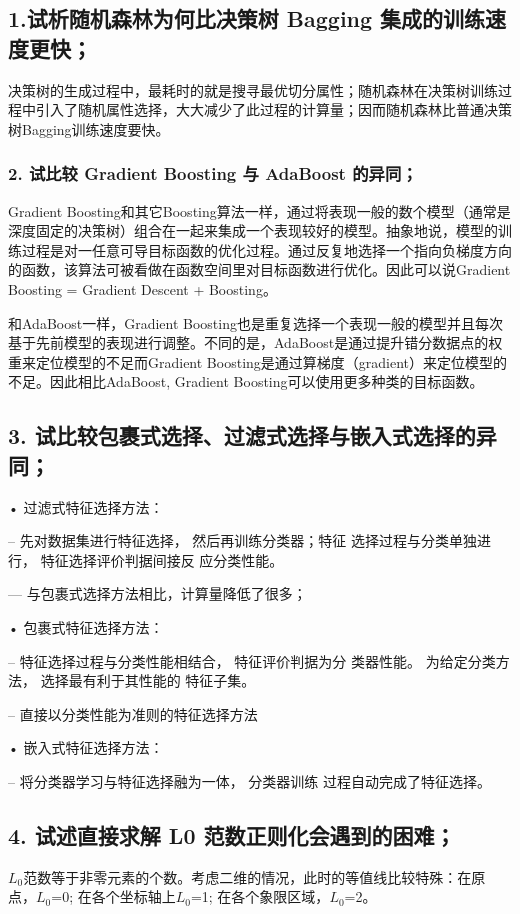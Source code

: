 \documentclass{article}
\date{\today}
\begin{document}
\makecover

\subsection*{1.试析随机森林为何比决策树 Bagging 集成的训练速度更快；}
  决策树的生成过程中，最耗时的就是搜寻最优切分属性；随机森林在决策树训练过程中引入了随机属性选择，大大减少了此过程的计算量；因而随机森林比普通决策树Bagging训练速度要快。

\subsubsection*{2. 试比较 Gradient Boosting 与 AdaBoost 的异同；}
Gradient Boosting和其它Boosting算法一样，通过将表现一般的数个模型（通常是深度固定的决策树）组合在一起来集成一个表现较好的模型。抽象地说，模型的训练过程是对一任意可导目标函数的优化过程。通过反复地选择一个指向负梯度方向的函数，该算法可被看做在函数空间里对目标函数进行优化。因此可以说Gradient Boosting = Gradient Descent + Boosting。

和AdaBoost一样，Gradient Boosting也是重复选择一个表现一般的模型并且每次基于先前模型的表现进行调整。不同的是，AdaBoost是通过提升错分数据点的权重来定位模型的不足而Gradient Boosting是通过算梯度（gradient）来定位模型的不足。因此相比AdaBoost, Gradient Boosting可以使用更多种类的目标函数。

\subsection*{3. 试比较包裹式选择、过滤式选择与嵌入式选择的异同；}
• 过滤式特征选择方法：

– 先对数据集进行特征选择， 然后再训练分类器；特征 选择过程与分类单独进行， 特征选择评价判据间接反 应分类性能。

— 与包裹式选择方法相比，计算量降低了很多；

• 包裹式特征选择方法：

– 特征选择过程与分类性能相结合， 特征评价判据为分 类器性能。 为给定分类方法， 选择最有利于其性能的 特征子集。

– 直接以分类性能为准则的特征选择方法

• 嵌入式特征选择方法：

– 将分类器学习与特征选择融为一体， 分类器训练 过程自动完成了特征选择。
\subsection*{4. 试述直接求解 L0 范数正则化会遇到的困难；}
$L_0$范数等于非零元素的个数。考虑二维的情况，此时的等值线比较特殊：在原点，$L_0$=0; 在各个坐标轴上$L_0$=1; 在各个象限区域，$L_0$=2。
\end{document}
